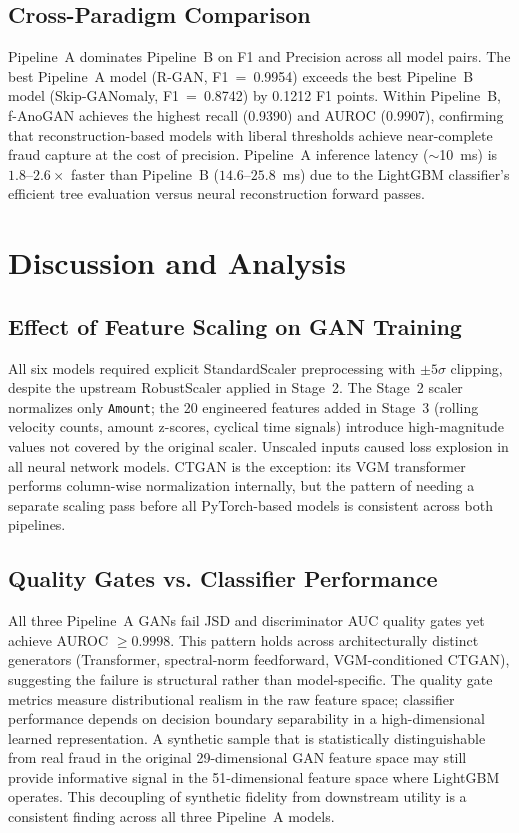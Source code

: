 \documentclass[conference]{IEEEtran}
\begin{document}
\subsection{Cross-Paradigm Comparison}

Pipeline~A dominates Pipeline~B on F1 and Precision across all model pairs.
The best Pipeline~A model (R-GAN, F1~=~0.9954) exceeds the best Pipeline~B
model (Skip-GANomaly, F1~=~0.8742) by 0.1212 F1 points. Within Pipeline~B,
f-AnoGAN achieves the highest recall (0.9390) and AUROC (0.9907), confirming
that reconstruction-based models with liberal thresholds achieve near-complete
fraud capture at the cost of precision. Pipeline~A inference latency
($\sim$10~ms) is $1.8$--$2.6\times$ faster than Pipeline~B ($14.6$--$25.8$~ms)
due to the LightGBM classifier's efficient tree evaluation versus neural
reconstruction forward passes.

\section{Discussion and Analysis}

\subsection{Effect of Feature Scaling on GAN Training}

All six models required explicit StandardScaler preprocessing with $\pm5\sigma$
clipping, despite the upstream RobustScaler applied in Stage~2. The Stage~2
scaler normalizes only \texttt{Amount}; the 20 engineered features added in
Stage~3 (rolling velocity counts, amount z-scores, cyclical time signals)
introduce high-magnitude values not covered by the original scaler.
Unscaled inputs caused loss explosion in all neural network models. CTGAN
is the exception: its VGM transformer performs column-wise normalization
internally, but the pattern of needing a separate scaling pass before all
PyTorch-based models is consistent across both pipelines.

\subsection{Quality Gates vs. Classifier Performance}

All three Pipeline~A GANs fail JSD and discriminator AUC quality gates yet
achieve AUROC $\geq 0.9998$. This pattern holds across architecturally
distinct generators (Transformer, spectral-norm feedforward, VGM-conditioned
CTGAN), suggesting the failure is structural rather than model-specific. The
quality gate metrics measure distributional realism in the raw feature space;
classifier performance depends on decision boundary separability in a
high-dimensional learned representation. A synthetic sample that is
statistically distinguishable from real fraud in the original 29-dimensional
GAN feature space may still provide informative signal in the 51-dimensional
feature space where LightGBM operates. This decoupling of synthetic fidelity
from downstream utility is a consistent finding across all three Pipeline~A
models.
\end{document}
